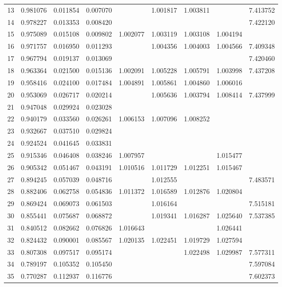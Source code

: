 \documentclass{elsarticle}
\begin{document}
\begin{center}
\begin{longtable}{|c|ccc|cccc|c|}
  13 & 0.981076 & 0.011854 & 0.007070 &  & 1.001817 & 1.003811 &  & 7.413752 \\
  14 & 0.978227 & 0.013353 & 0.008420 &  &  &  &  & 7.422120 \\
  15 & 0.975089 & 0.015108 & 0.009802 & 1.002077 & 1.003119 & 1.003108 & 1.004194 &  \\
  16 & 0.971757 & 0.016950 & 0.011293 &  & 1.004356 & 1.004003 & 1.004566 & 7.409348 \\
  17 & 0.967794 & 0.019137 & 0.013069 &  &  &  &  & 7.420460 \\
  18 & 0.963364 & 0.021500 & 0.015136 & 1.002091 & 1.005228 & 1.005791 & 1.003998 & 7.437208 \\
  19 & 0.958416 & 0.024100 & 0.017484 & 1.004891 & 1.005861 & 1.004860 & 1.006016 &  \\
  20 & 0.953069 & 0.026717 & 0.020214 &  & 1.005636 & 1.003794 & 1.008414 & 7.437999 \\
  21 & 0.947048 & 0.029924 & 0.023028 &  &  &  &  &  \\
  22 & 0.940179 & 0.033560 & 0.026261 & 1.006153 & 1.007096 & 1.008252 &  &  \\
  23 & 0.932667 & 0.037510 & 0.029824 &  &  &  &  &  \\
  24 & 0.924524 & 0.041645 & 0.033831 &  &  &  &  &  \\
  25 & 0.915346 & 0.046408 & 0.038246 & 1.007957 &  &  & 1.015477 &  \\
  26 & 0.905342 & 0.051467 & 0.043191 & 1.010516 & 1.011729 & 1.012251 & 1.015467 &  \\
  27 & 0.894245 & 0.057039 & 0.048716 &  & 1.012555 &  &  & 7.483571 \\
  28 & 0.882406 & 0.062758 & 0.054836 & 1.011372 & 1.016589 & 1.012876 & 1.020804 &  \\
  29 & 0.869424 & 0.069073 & 0.061503 &  & 1.016164 &  &  & 7.515181 \\
  30 & 0.855441 & 0.075687 & 0.068872 &  & 1.019341 & 1.016287 & 1.025640 & 7.537385 \\
  31 & 0.840512 & 0.082662 & 0.076826 & 1.016643 &  &  & 1.026441 &  \\
  32 & 0.824432 & 0.090001 & 0.085567 & 1.020135 & 1.022451 & 1.019729 & 1.027594 &  \\
  33 & 0.807308 & 0.097517 & 0.095174 &  &  & 1.022498 & 1.029987 & 7.577311 \\
  34 & 0.789197 & 0.105352 & 0.105450 &  &  &  &  & 7.597084 \\
  35 & 0.770287 & 0.112937 & 0.116776 &  &  &  &  & 7.602373 \\

\end{longtable}
\end{center}
\end{document}
